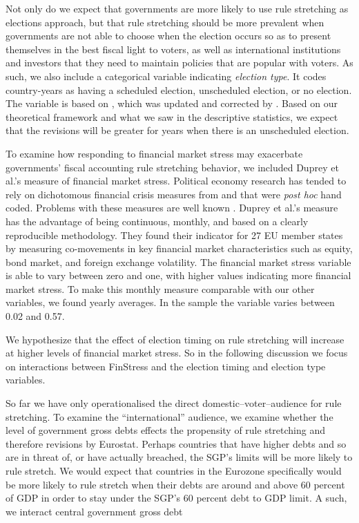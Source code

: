 \documentclass[]{article}
\begin{document}
Not only do we expect that governments are more likely to use rule stretching as elections approach, but that rule stretching should be more prevalent when governments are not able to choose when the election occurs so as to present themselves in the best fiscal light to voters, as well as international institutions and investors that they need to maintain policies that are popular with voters. As such, we also include a categorical variable indicating \emph{election type}. It codes country-years as having a scheduled election, unscheduled election, or no election. The variable is based on \cite{Brender2008}, which was updated and corrected by \cite{hallerbergWehner2015}. Based on our theoretical framework and what we saw in the descriptive statistics, we expect that the revisions will be greater for years when there is an unscheduled election.

To examine how responding to financial market stress may exacerbate governments' fiscal accounting rule stretching behavior, we included Duprey et al.'s \citeyearpar{ThibautDuprey2015} measure of financial market stress. Political economy research has tended to rely on dichotomous financial crisis measures from \cite{Laeven2012} and \cite{ReinhartRog2010} that were \emph{post hoc} hand coded. Problems with these measures are well known \citep[see][]{finstress_paper}. Duprey et al.'s measure has the advantage of being continuous, monthly, and based on a clearly reproducible methodology. They found their indicator for 27 EU member states by measuring co-movements in key financial market characteristics such as equity, bond market, and foreign exchange volatility. The financial market stress variable is able to vary between zero and one, with higher values indicating more financial market stress. To make this monthly measure comparable with our other variables, we found yearly averages. In the sample the variable varies between 0.02 and 0.57.

We hypothesize that the effect of election timing on rule stretching will increase at higher levels of financial market stress. So in the following discussion we focus on interactions between FinStress and the election timing and election type variables.

So far we have only operationalised the direct domestic--voter--audience for rule stretching. To examine the ``international'' audience, we examine whether the level of government gross debts effects the propensity of rule stretching and therefore revisions by Eurostat. Perhaps countries that have higher debts and so are in threat of, or have actually breached, the SGP's limits will be more likely to rule stretch. We would expect that countries in the Eurozone specifically would be more likely to rule stretch when their debts are around and above 60 percent of GDP in order to stay under the SGP's 60 percent debt to GDP limit. A such, we interact central government gross debt 
\end{document}
